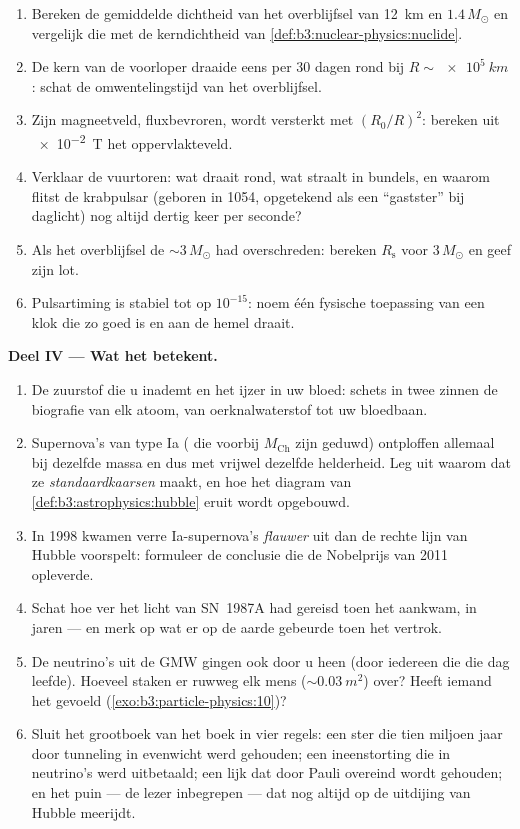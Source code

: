 \begin{problem}
\begin{enumerate}[resume]
  \item Bereken de gemiddelde dichtheid van het overblijfsel van \qty{12}{km}
        en $1.4\,M_\odot$ en vergelijk die met de kerndichtheid van
        \cref{def:b3:nuclear-physics:nuclide}.
  \item De kern van de voorloper draaide eens per 30 dagen rond bij
        $R \sim \qty{e5}{km}$: schat de omwentelingstijd van het overblijfsel.
  \item Zijn magneetveld, fluxbevroren, wordt versterkt met
        $(R_0/R)^2$: bereken uit \qty{e-2}{T} het oppervlakteveld.
  \item Verklaar de vuurtoren: wat draait rond, wat straalt in bundels, en
        waarom flitst de krabpulsar (geboren in 1054, opgetekend als een
        ``gastster'' bij daglicht) nog altijd dertig keer per seconde?
  \item Als het overblijfsel de ${\sim}3\,M_\odot$ had overschreden: bereken
        $R_{\text{s}}$ voor $3\,M_\odot$ en geef zijn lot.
  \item Pulsartiming is stabiel tot op $10^{-15}$: noem één
        fysische toepassing van een klok die zo goed is en aan de hemel draait.
\end{enumerate}

\medskip\noindent\textbf{Deel IV --- Wat het betekent.}

\begin{enumerate}[resume]
  \item De zuurstof die u inademt en het ijzer in uw bloed:
        schets in twee zinnen de biografie van elk atoom, van
        oerknalwaterstof tot uw bloedbaan.
  \item Supernova's van type Ia ( die voorbij
        $M_{\text{Ch}}$ zijn geduwd) ontploffen allemaal bij dezelfde massa en dus
        met vrijwel dezelfde helderheid. Leg uit waarom dat ze
        \emph{standaardkaarsen} maakt, en hoe het diagram van
        \cref{def:b3:astrophysics:hubble} eruit wordt
        opgebouwd.
  \item In 1998 kwamen verre Ia-supernova's \emph{flauwer} uit
        dan de rechte lijn van Hubble voorspelt: formuleer de
        conclusie die de Nobelprijs van 2011 opleverde.
  \item Schat hoe ver het licht van SN~1987A had gereisd toen het
        aankwam, in jaren --- en merk op wat er op de
        aarde gebeurde toen het vertrok.
  \item De neutrino's uit de GMW gingen ook door u heen (door iedereen
        die die dag leefde). Hoeveel staken er ruwweg elk mens
        (${\sim}\qty{0.03}{m^2}$) over? Heeft iemand het gevoeld
        (\cref{exo:b3:particle-physics:10})?
  \item Sluit het grootboek van het boek in vier regels: een ster die
        tien miljoen jaar door tunneling in evenwicht werd gehouden; een ineenstorting die
        in neutrino's werd uitbetaald; een lijk dat door Pauli overeind wordt gehouden; en het
        puin --- de lezer inbegrepen --- dat nog altijd
        op de uitdijing van Hubble meerijdt.
\end{enumerate}
\end{problem}
